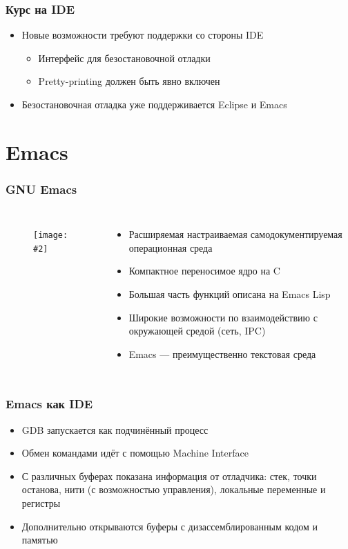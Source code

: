 \documentclass[onlymath]{beamer}
\newcommand{\cenfig}[2]{\begin{figure}\centering\texttt{[image: \#2]}
  \end{figure}}
\begin{document}
\begin{frame}
  \frametitle{Курс на IDE}
  \begin{itemize}
  \item Новые возможности требуют поддержки со стороны IDE
    \begin{itemize}
    \item Интерфейс для безостановочной отладки
    \item Pretty-printing должен быть явно включен
    \end{itemize}
  \item Безостановочная отладка уже поддерживается Eclipse и Emacs
  \end{itemize}
\end{frame}

\section{Emacs}
\begin{frame}
  \frametitle{GNU Emacs}
  \begin{columns}
    \cenfig{0.2}{emacs.png}
  \begin{itemize}
  \item Расширяемая настраиваемая самодокументируемая операционная
    среда
  \item Компактное переносимое ядро на C
  \item Большая часть функций описана на Emacs Lisp
  \item Широкие возможности по взаимодействию с окружающей средой
    (сеть, IPC)
  \item Emacs — преимущественно текстовая среда
  \end{itemize}
\end{columns}
\end{frame}

\begin{frame}
  \frametitle{Emacs как IDE}
  \begin{itemize}
  \item GDB запускается как подчинённый процесс
  \item Обмен командами идёт с помощью Machine Interface
  \item С различных буферах показана информация от отладчика: стек,
    точки останова, нити (с возможностью управления), локальные
    переменные и регистры
  \item Дополнительно открываются буферы с дизассемблированным кодом и
    памятью
  \end{itemize}
\end{frame}
\end{document}
